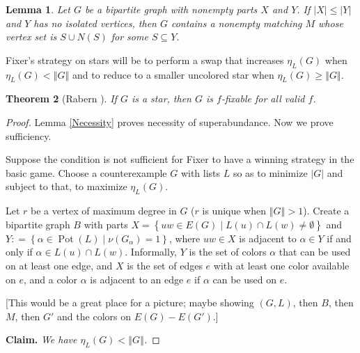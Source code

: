 \documentclass[12pt,reqno]{amsart}
\theoremstyle{plain}
\newtheorem{thm}{Theorem}
\newtheorem{lem}[thm]{Lemma}
\theoremstyle{definition}
\theoremstyle{remark}
\newcommand{\setb}[3]{\left\{ #1 \in #2 \mid #3 \right\}}
\newcommand{\card}[1]{\left|#1\right|}
\newcommand{\size}[1]{\left\Vert#1\right\Vert}
\newcommand{\DefinedAs}{\mathrel{\mathop:}=}
\newcommand{\pot}{\operatorname{Pot}}
\begin{document}
\begin{lem}\label{SpannerSpecial}
Let $G$ be a bipartite graph with nonempty parts $X$ and $Y$.  If $|X| \le |Y|$ and $Y$ has no isolated vertices, then $G$ contains a nonempty matching $M$ whose vertex set is $S \cup N(S)$ for some $S \subseteq Y$.
\end{lem}

Fixer's strategy on stars will be to perform a swap that increases $\eta_L(G)$
when $\eta_L(G) < \size{G}$ and to reduce to a smaller uncolored star when
$\eta_L(G) \ge \size{G}$.

\begin{thm}[Rabern \cite{HallGame}]\label{HallGame}
If $G$ is a star, then $G$ is $f$-fixable for all valid $f$.
\end{thm}
\begin{proof}
Lemma \ref{Necessity} proves necessity of superabundance. Now we prove sufficiency. 

Suppose the condition is not sufficient for Fixer to have a winning strategy in the basic game.  Choose a counterexample $G$ with lists $L$ so as to minimize $\card{G}$ and subject to that, to maximize $\eta_L(G)$.

Let $r$ be a vertex of maximum degree in $G$ ($r$ is unique when $\size{G}>1$).
 Create a bipartite graph $B$ with parts $X = \setb{uw}{E(G)}{L(u)
\cap L(w) \ne \emptyset}$ and $Y \DefinedAs
\setb{\alpha}{\pot(L)}{\nu(G_\alpha) = 1}$, where $uw \in X$ is adjacent to
$\alpha \in Y$ if and only if $\alpha \in L(u) \cap L(w)$. Informally, $Y$ is
the set of colors $\alpha$ that can be used on at least one edge, and $X$ is
the set of edges $e$ with at least one color available on $e$, and a
color $\alpha$ is adjacent to an edge $e$ if $\alpha$ can be used on $e$.
\bigskip

[This would be a great place for a picture; maybe showing $(G,L)$, then $B$,
then $M$, then $G'$ and the colors on $E(G)-E(G')$.]
\bigskip

\noindent\textbf{Claim.  }\textit{We have $\eta_L(G) < \size{G}$.}


\end{proof}
\end{document}
